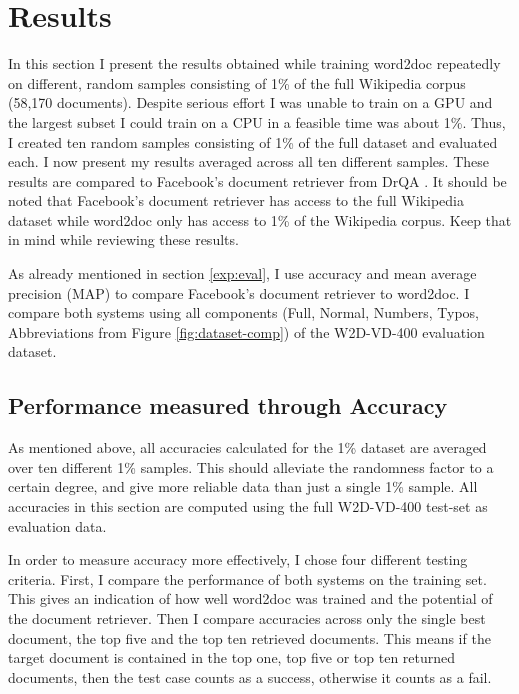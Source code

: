 \chapter{Results}
\label{results}

In this section I present the results obtained while training word2doc repeatedly on different, random samples consisting of 1\% of
the full Wikipedia corpus (58,170 documents). Despite serious effort I was unable to train on a GPU and the largest subset I could
train on a CPU in a feasible time was about 1\%. Thus, I created ten random samples consisting of 1\% of the full dataset and
evaluated each. I now present my results averaged across all ten different samples. These results are compared to Facebook's document
retriever from DrQA \citep{drqa}. It should be noted that Facebook's document retriever has access to the full Wikipedia dataset while
word2doc only has access to 1\% of the Wikipedia corpus. Keep that in mind while reviewing these results.

As already mentioned in section \ref{exp:eval}, I use accuracy and mean average precision (MAP) to compare Facebook's document
retriever to word2doc. I compare both systems using all components (Full, Normal, Numbers, Typos, Abbreviations from Figure
\ref{fig:dataset-comp}) of the W2D-VD-400 evaluation dataset.

\section{Performance measured through Accuracy}

As mentioned above, all accuracies calculated for the 1\% dataset are averaged over ten different 1\% samples. This should
alleviate the randomness factor to a certain degree, and give more reliable data than just a single 1\% sample. All accuracies in
this section are computed using the full W2D-VD-400 test-set as evaluation data.

In order to measure accuracy more effectively, I chose four different testing criteria. First, I compare the performance of both
systems on the training set. This gives an indication of how well word2doc was trained and the potential of the document
retriever. Then I compare accuracies across only the single best document, the top five and the top ten retrieved documents.
This means if the target document is contained in the top one, top five or top ten returned documents, then the test case counts
as a success, otherwise it counts as a fail.


